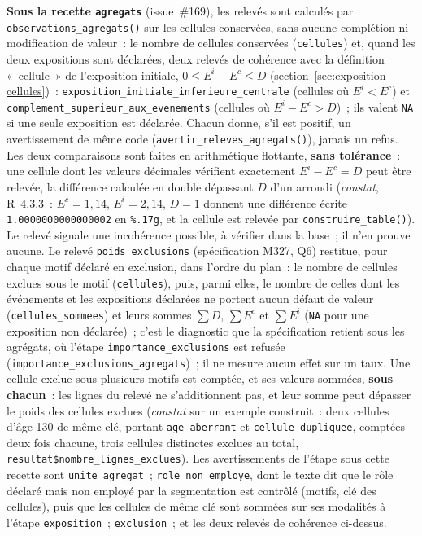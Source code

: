 \documentclass[a4paper,11pt]{article}
\newcommand{\code}[1]{\texttt{\small #1}}
\begin{document}
\medskip
{\sloppy{} \textbf{Sous la recette \code{agregats}} (issue~\#169), les relevés sont
calculés par \code{observations\_agregats()} sur les cellules conservées,
sans aucune complétion ni modification de valeur~: le nombre de cellules
conservées (\code{cellules}) et, quand les deux expositions sont déclarées,
deux relevés de cohérence avec la définition «~cellule~» de l'exposition
initiale, $0 \le E^i - E^c \le D$ (section~\ref{sec:exposition-cellules})~:
\code{exposition\_initiale\_inferieure\_centrale} (cellules où
$E^i < E^c$) et \code{complement\_superieur\_aux\_evenements} (cellules
où $E^i - E^c > D$)~; ils valent \code{NA} si une seule exposition est
déclarée. Chacun donne, s'il est positif, un avertissement de même code
(\code{avertir\_releves\_agregats()}), jamais un refus. Les deux
comparaisons sont faites en arithmétique flottante, \textbf{sans
tolérance}~: une cellule dont les valeurs décimales vérifient exactement
$E^i - E^c = D$ peut être relevée, la différence calculée en double
dépassant $D$ d'un arrondi (\emph{constat}, R~4.3.3~: $E^c = 1{,}14$,
$E^i = 2{,}14$, $D = 1$ donnent une différence écrite
\code{1.0000000000000002} en \code{\%.17g}, et la cellule est relevée
par \code{construire\_table()}). Le relevé signale une incohérence
possible, à vérifier dans la base~; il n'en prouve aucune.
Le relevé \code{poids\_exclusions} (spécification M327, Q6) restitue,
pour chaque motif déclaré en exclusion, dans l'ordre du plan~: le nombre de
cellules exclues sous le motif (\code{cellules}), puis, parmi elles, le
nombre de celles dont les événements et les expositions déclarées ne portent
aucun défaut de valeur (\code{cellules\_sommees}) et leurs sommes
$\sum D$, $\sum E^c$ et $\sum E^i$ (\code{NA} pour une exposition non
déclarée)~; c'est le diagnostic que la spécification retient sous les
agrégats, où l'étape \code{importance\_exclusions} est refusée
(\code{importance\_exclusions\_agregats})~; il ne mesure aucun effet sur
un taux.
Une cellule exclue sous plusieurs motifs est comptée, et ses valeurs
sommées, \textbf{sous chacun}~: les lignes du relevé ne s'additionnent pas,
et leur somme peut dépasser le poids des cellules exclues
(\emph{constat} sur un exemple construit~: deux cellules d'âge 130 de même
clé, portant \code{age\_aberrant} et \code{cellule\_dupliquee},
comptées deux fois chacune, trois cellules distinctes exclues au total,
\code{resultat\$nombre\_lignes\_exclues}). Les avertissements de
l'étape sous cette recette sont \code{unite\_agregat}~;
\code{role\_non\_employe}, dont le texte dit que le rôle déclaré mais non
employé par la segmentation est contrôlé (motifs, clé des cellules), puis
que les cellules de même clé sont sommées sur ses modalités à l'étape
\code{exposition}~; \code{exclusion}~; et les deux relevés de cohérence
ci-dessus.\par}
\end{document}
